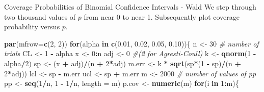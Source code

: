 \documentclass[
  ignorenonframetext,
]{beamer}
\newenvironment{Shaded}{\begin{snugshade}}{\end{snugshade}}
\newcommand{\AttributeTok}[1]{\textcolor[rgb]{0.13,0.29,0.53}{#1}}
\newcommand{\CommentTok}[1]{\textcolor[rgb]{0.56,0.35,0.01}{\textit{#1}}}
\newcommand{\ControlFlowTok}[1]{\textcolor[rgb]{0.13,0.29,0.53}{\textbf{#1}}}
\newcommand{\DecValTok}[1]{\textcolor[rgb]{0.00,0.00,0.81}{#1}}
\newcommand{\FloatTok}[1]{\textcolor[rgb]{0.00,0.00,0.81}{#1}}
\newcommand{\FunctionTok}[1]{\textcolor[rgb]{0.13,0.29,0.53}{\textbf{#1}}}
\newcommand{\NormalTok}[1]{#1}
\newcommand{\OtherTok}[1]{\textcolor[rgb]{0.56,0.35,0.01}{#1}}
\newcommand{\SpecialCharTok}[1]{\textcolor[rgb]{0.81,0.36,0.00}{\textbf{#1}}}
\begin{document}
\begin{frame}[fragile]{Coverage Probabilities of Binomial Confidence
Intervals - Wald}
\protect\hypertarget{coverage-probabilities-of-binomial-confidence-intervals---wald}{}
We step through two thousand values of \(p\) from near 0 to near 1.
Subsequently plot coverage probability versus \(p\).

\tiny

\begin{Shaded}
\begin{Highlighting}[]
\FunctionTok{par}\NormalTok{(}\AttributeTok{mfrow=}\FunctionTok{c}\NormalTok{(}\DecValTok{2}\NormalTok{, }\DecValTok{2}\NormalTok{))}
\ControlFlowTok{for}\NormalTok{(alpha }\ControlFlowTok{in} \FunctionTok{c}\NormalTok{(}\FloatTok{0.01}\NormalTok{, }\FloatTok{0.02}\NormalTok{, }\FloatTok{0.05}\NormalTok{, }\FloatTok{0.10}\NormalTok{))\{}
\NormalTok{n }\OtherTok{\textless{}{-}} \DecValTok{30}     \CommentTok{\# number of trials}
\NormalTok{CL }\OtherTok{\textless{}{-}} \DecValTok{1} \SpecialCharTok{{-}}\NormalTok{ alpha}
\NormalTok{x }\OtherTok{\textless{}{-}} \DecValTok{0}\SpecialCharTok{:}\NormalTok{n }
\NormalTok{adj }\OtherTok{\textless{}{-}} \DecValTok{0}    \CommentTok{\#(2 for Agresti{-}Coull)}
\NormalTok{k }\OtherTok{\textless{}{-}} \FunctionTok{qnorm}\NormalTok{(}\DecValTok{1} \SpecialCharTok{{-}}\NormalTok{ alpha}\SpecialCharTok{/}\DecValTok{2}\NormalTok{)}
\NormalTok{sp }\OtherTok{\textless{}{-}}\NormalTok{ (x }\SpecialCharTok{+}\NormalTok{ adj)}\SpecialCharTok{/}\NormalTok{(n }\SpecialCharTok{+} \DecValTok{2}\SpecialCharTok{*}\NormalTok{adj)}
\NormalTok{m.err }\OtherTok{\textless{}{-}}\NormalTok{ k }\SpecialCharTok{*} \FunctionTok{sqrt}\NormalTok{(sp}\SpecialCharTok{*}\NormalTok{(}\DecValTok{1} \SpecialCharTok{{-}}\NormalTok{ sp)}\SpecialCharTok{/}\NormalTok{(n }\SpecialCharTok{+} \DecValTok{2}\SpecialCharTok{*}\NormalTok{adj))}
\NormalTok{lcl }\OtherTok{\textless{}{-}}\NormalTok{ sp }\SpecialCharTok{{-}}\NormalTok{ m.err}
\NormalTok{ucl }\OtherTok{\textless{}{-}}\NormalTok{ sp }\SpecialCharTok{+}\NormalTok{ m.err}
\NormalTok{m }\OtherTok{\textless{}{-}} \DecValTok{2000} \CommentTok{\# number of values of pp}
\NormalTok{pp }\OtherTok{\textless{}{-}} \FunctionTok{seq}\NormalTok{(}\DecValTok{1}\SpecialCharTok{/}\NormalTok{n, }\DecValTok{1} \SpecialCharTok{{-}} \DecValTok{1}\SpecialCharTok{/}\NormalTok{n, }\AttributeTok{length =}\NormalTok{ m)}
\NormalTok{p.cov }\OtherTok{\textless{}{-}} \FunctionTok{numeric}\NormalTok{(m)}
\ControlFlowTok{for}\NormalTok{(i }\ControlFlowTok{in} \DecValTok{1}\SpecialCharTok{:}\NormalTok{m)\{}

\end{Highlighting}
\end{Shaded}
\end{frame}
\end{document}
